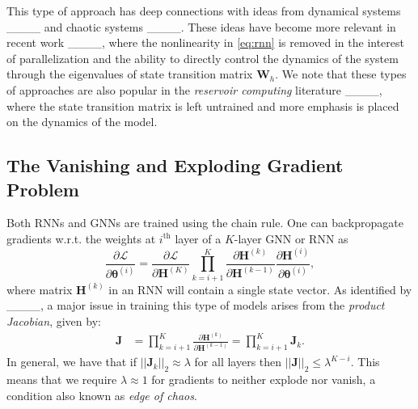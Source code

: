 This type of approach has deep connections with ideas from dynamical systems ____ and chaotic systems ____. These ideas have become more relevant in recent work ____, where the nonlinearity in \eqref{eq:rnn} is removed in the interest of parallelization and the ability to directly control the dynamics of the system through the eigenvalues of state transition matrix $\mathbf{W}_h$. We note that these types of approaches are also popular in the \textit{reservoir computing} literature ____, where the state transition matrix is left untrained and more emphasis is placed on the dynamics of the model.
\vspace{-0.2cm}

\subsection{The Vanishing and Exploding Gradient Problem}

Both RNNs and GNNs are trained using the chain rule. One can backpropagate gradients w.r.t. the weights at $i^{\text{th}}$ layer of a $K$-layer GNN or RNN as 
\begin{equation}
	\frac{\partial\mathcal{L}}{\partial\mathbf{\boldsymbol{\theta}}^{(i)}}
	=
	\frac{\partial\mathcal{L}}{\partial\mathbf{H}^{(K)}}
	\prod_{k=i+1}^{K}
	\frac{\partial\mathbf{H}^{(k)}}{\partial\mathbf{H}^{(k-1)}}
	\frac{\partial\mathbf{H}^{(i)}}{\partial\mathbf{\boldsymbol{\theta}}^{(i)}},
\end{equation}
where matrix $\mathbf{H}^{(k)}$ in an RNN will contain a single state vector. As identified by ____, a major issue in training this type of models arises from the \textit{product Jacobian}, given by:  
\begin{align}
	\mathbf{J}
	&=
	\prod_{k=i+1}^{K}
	\frac{\partial\mathbf{H}^{(k)}}{\partial\mathbf{H}^{(k-1)}} = \prod_{k=i+1}^{K}\mathbf{J}_k.
\end{align}
In general, we have that if $||\mathbf{J}_k||_2 \approx \lambda$ for all layers then $||\mathbf{J}||_2 \le \lambda^{K-i}$. This means that we require $\lambda \approx 1$ for gradients to neither explode nor vanish, a condition also known as \textit{edge of chaos}. %

